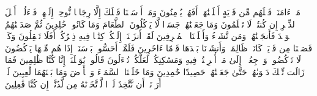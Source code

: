 \stopbuffer
\startbuffer[\q:21:6]
مَاۤ ءَامَنَتۡ قَبۡلَهُم مِّن قَرۡیَةٍ أَهۡلَكۡنَٰهَاۤۖ أَفَهُمۡ یُؤۡمِنُونَ%
\stopbuffer
\startbuffer[\q:21:7]
وَمَاۤ أَرۡسَلۡنَا قَبۡلَكَ إِلَّا رِجَالࣰا نُّوحِیۤ إِلَیۡهِمۡۖ فَسۡءَلُوۤا۟ أَهۡلَ ٱلذِّكۡرِ إِن كُنتُمۡ لَا تَعۡلَمُونَ%
\stopbuffer
\startbuffer[\q:21:8]
وَمَا جَعَلۡنَٰهُمۡ جَسَدࣰا لَّا یَأۡكُلُونَ ٱلطَّعَامَ وَمَا كَانُوا۟ خَٰلِدِینَ%
\stopbuffer
\startbuffer[\q:21:9]
ثُمَّ صَدَقۡنَٰهُمُ ٱلۡوَعۡدَ فَأَنجَیۡنَٰهُمۡ وَمَن نَّشَاۤءُ وَأَهۡلَكۡنَا ٱلۡمُسۡرِفِینَ%
\stopbuffer
\startbuffer[\q:21:10]
لَقَدۡ أَنزَلۡنَاۤ إِلَیۡكُمۡ كِتَٰبࣰا فِیهِ ذِكۡرُكُمۡۚ أَفَلَا تَعۡقِلُونَ%
\stopbuffer
\startbuffer[\q:21:11]
وَكَمۡ قَصَمۡنَا مِن قَرۡیَةࣲ كَانَتۡ ظَالِمَةࣰ وَأَنشَأۡنَا بَعۡدَهَا قَوۡمًا ءَاخَرِینَ%
\stopbuffer
\startbuffer[\q:21:12]
فَلَمَّاۤ أَحَسُّوا۟ بَأۡسَنَاۤ إِذَا هُم مِّنۡهَا یَرۡكُضُونَ%
\stopbuffer
\startbuffer[\q:21:13]
لَا تَرۡكُضُوا۟ وَٱرۡجِعُوۤا۟ إِلَىٰ مَاۤ أُتۡرِفۡتُمۡ فِیهِ وَمَسَٰكِنِكُمۡ لَعَلَّكُمۡ تُسۡءَلُونَ%
\stopbuffer
\startbuffer[\q:21:14]
قَالُوا۟ یَٰوَیۡلَنَاۤ إِنَّا كُنَّا ظَٰلِمِینَ%
\stopbuffer
\startbuffer[\q:21:15]
فَمَا زَالَت تِّلۡكَ دَعۡوَىٰهُمۡ حَتَّىٰ جَعَلۡنَٰهُمۡ حَصِیدًا خَٰمِدِینَ%
\stopbuffer
\startbuffer[\q:21:16]
وَمَا خَلَقۡنَا ٱلسَّمَاۤءَ وَٱلۡأَرۡضَ وَمَا بَیۡنَهُمَا لَٰعِبِینَ%
\stopbuffer
\startbuffer[\q:21:17]
لَوۡ أَرَدۡنَاۤ أَن نَّتَّخِذَ لَهۡوࣰا لَّٱتَّخَذۡنَٰهُ مِن لَّدُنَّاۤ إِن كُنَّا فَٰعِلِینَ%
\stopbuffer

